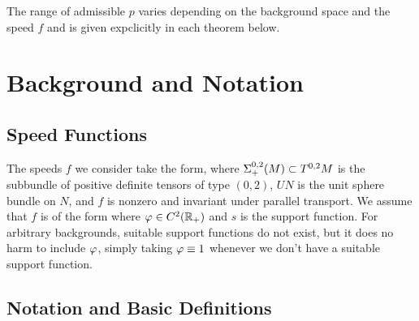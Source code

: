 The range of admissible $p$ varies depending on the background space and the speed $f$ and is given expclicitly in each theorem below.


\section{Background and Notation}
\label{sec:background}

\subsection{Speed Functions}
\label{subsec:bg_speed}

The speeds $f$ we consider take the form,
where $\Sigma^{0,2}_{+}(M)\subset T^{0,2}M$ is the subbundle of positive definite tensors of type $(0,2)$, $UN$ is the unit sphere bundle on $N$, and $f$ is nonzero and invariant under parallel transport. We assume that $f$ is of the form
where $\varphi\in C^2(\mathbb{R}_+)$ and $s$ is the support function. For arbitrary backgrounds, suitable support functions do not exist, but it does no harm to include $\varphi$, simply taking $\varphi \equiv 1$ whenever we don't have a suitable support function.

\subsection{Notation and Basic Definitions}
\label{subsec:bg_notation}

